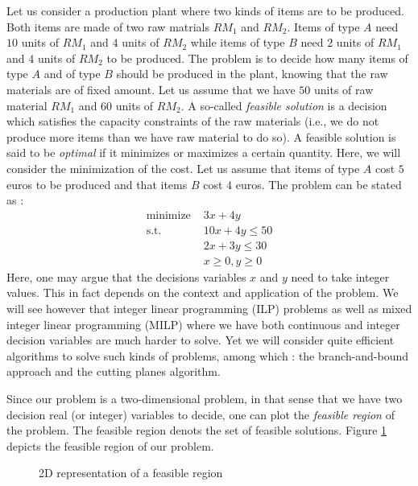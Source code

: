 Let us consider a production plant where two kinds of items are to be produced. Both items are made of two raw matrials $RM_1$ and $RM_2$. Items of type $A$ need $10$ units of $RM_1$ and $4$ units of $RM_2$ while items of type $B$ need $2$ units of $RM_1$ and $4$ units of $RM_2$ to be produced. The problem is to decide how many items of type $A$ and of type $B$ should be produced in the plant, knowing that the raw materials are of fixed amount. Let us assume that we have $50$ units of raw material $RM_1$ and $60$ units of $RM_2$. A so-called \textit{feasible solution} is a decision which satisfies the capacity constraints of the raw materials (i.e., we do not produce more items than we have raw material to do so). A feasible solution is said to be \textit{optimal} if it minimizes or maximizes a certain quantity. Here, we will consider the minimization of the cost. Let us assume that items of type $A$ cost $5$ euros to be produced and that items $B$ cost $4$ euros. The problem can be stated as : 
\begin{align*}
    \textrm{minimize } & 3x + 4y\\
    \textrm{s.t. } & 10x + 4y \le 50\\
    & 2x + 3y \le 30\\
    & x\ge 0, y\ge 0
\end{align*}
Here, one may argue that the decisions variables $x$ and $y$ need to take integer values. This in fact depends on the context and application of the problem. We will see however that integer linear programming (ILP) problems as well as mixed integer linear programming (MILP) where we have both continuous and integer decision variables are much harder to solve. Yet we will consider quite efficient algorithms to solve such kinds of problems, among which : the branch-and-bound approach and the cutting planes algorithm. 

Since our problem is a two-dimensional problem, in that sense that we have two decision real (or integer) variables to decide, one can plot the \textit{feasible region} of the problem. The feasible region denots the set of feasible solutions. Figure \ref{fig:feasible_region} depicts the feasible region of our problem. 

\begin{figure}[h!]
    \centering
    \caption{2D representation of a feasible region}
    \label{fig:feasible_region}
\end{figure}

